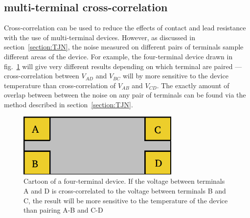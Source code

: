 \subsection{multi-terminal cross-correlation}
Cross-correlation can be used to reduce the effects of contact and lead resistance with the use of multi-terminal devices. However, as discussed in section~\ref{section:TJN}, the noise measured on different pairs of terminals sample different areas of the device. For example, the four-terminal device drawn in fig.~\ref{fig:4terminal} will give very different results depending on which terminal are paired --- cross-correlation between $V_{AD}$ and $V_{BC}$ will by more sensitive to the device temperature than cross-correlation of $V_{AB}$ and $V_{CD}$. The exactly amount of overlap between between the noise on any pair of terminals can be found via the method described in section~\ref{section:TJN}.
\begin{figure}
\centering
\includegraphics[width=80mm]{figures/Johnson_noise_thermometry/4terminal.png}
\caption{Cartoon of a four-terminal device. If the voltage between terminals A and D is cross-correlated to the voltage between terminals B and C, the result will be more sensitive to the temperature of the device than pairing A-B and C-D}
\label{fig:4terminal}
\end{figure}

